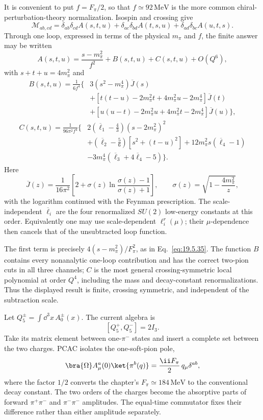 \begin{enumerate}
  It is convenient to put \(f=F_\pi/2\), so that \(f\simeq92\,\mathrm{MeV}\)
  is the more common chiral-perturbation-theory normalization.  Isospin
  and crossing give
  \[
    \mathcal M_{ab,cd}
      =\delta_{ab}\delta_{cd}A(s,t,u)
       +\delta_{ac}\delta_{bd}A(t,s,u)
       +\delta_{ad}\delta_{bc}A(u,t,s).
  \]
  Through one loop, expressed in terms of the physical \(m_\pi\) and
  \(f\), the finite answer may be written
  \[
    A(s,t,u)=\frac{s-m_\pi^2}{f^2}+B(s,t,u)+C(s,t,u)+O(Q^6),
  \]
  with \(s+t+u=4m_\pi^2\) and
  \[
  \begin{split}
    B(s,t,u)=\frac1{6f^4}\Big\{&
      3(s^2-m_\pi^4)\overline J(s)\\
      &+[t(t-u)-2m_\pi^2t+4m_\pi^2u-2m_\pi^4]\overline J(t)\\
      &+[u(u-t)-2m_\pi^2u+4m_\pi^2t-2m_\pi^4]\overline J(u)\Big\},
  \end{split}
  \]
  \[
  \begin{split}
    C(s,t,u)=\frac1{96\pi^2f^4}\Big\{&
      2\left(\overline\ell_1-\frac43\right)(s-2m_\pi^2)^2\\
      &+\left(\overline\ell_2-\frac56\right)
       [s^2+(t-u)^2]
       +12m_\pi^2s(\overline\ell_4-1)\\
      &-3m_\pi^4(\overline\ell_3+4\overline\ell_4-5)\Big\}.
  \end{split}
  \]
  Here
  \[
    \overline J(z)=\frac1{16\pi^2}
      \left[
       2+\sigma(z)\ln\frac{\sigma(z)-1}{\sigma(z)+1}
      \right],
    \qquad
    \sigma(z)=\sqrt{1-\frac{4m_\pi^2}{z}},
  \]
  with the logarithm continued with the Feynman prescription.  The
  scale-independent \(\overline\ell_i\) are the four renormalized
  \(SU(2)\) low-energy constants at this order.  Equivalently one may use
  scale-dependent \(\ell_i^r(\mu)\); their \(\mu\)-dependence then cancels
  that of the unsubtracted loop function.

  The first term is precisely
  \(4(s-m_\pi^2)/F_\pi^2\), as in Eq.~\eqref{eq:19.5.35}.  The function
  \(B\) contains every nonanalytic one-loop contribution and has the
  correct two-pion cuts in all three channels; \(C\) is the most general
  crossing-symmetric local polynomial at order \(Q^4\), including the
  mass and decay-constant renormalizations.  Thus the displayed result is
  finite, crossing symmetric, and independent of the subtraction scale.

  Let
  \(Q_5^\pm=\int \dd^3x\,A_0^\pm(x)\).  The current algebra is
  \[
    [Q_5^+,Q_5^-]=2I_3.
  \]
  Take its matrix element between one-\(\pi^-\) states and insert a
  complete set between the two charges.  PCAC isolates the one-soft-pion
  pole,
  \[
    \bra{\Omega}A_\mu^a(0)\ket{\pi^b(q)}
       =\frac{\ii F_\pi}{2}\,q_\mu\delta^{ab},
  \]
  where the factor \(1/2\) converts the chapter's
  \(F_\pi\simeq184\,\mathrm{MeV}\) to the conventional decay constant.
  The two orders of the charges become the absorptive parts of forward
  \(\pi^+\pi^-\) and \(\pi^-\pi^-\) amplitudes.  The equal-time
  commutator fixes their difference rather than either amplitude
  separately.


\end{enumerate}
